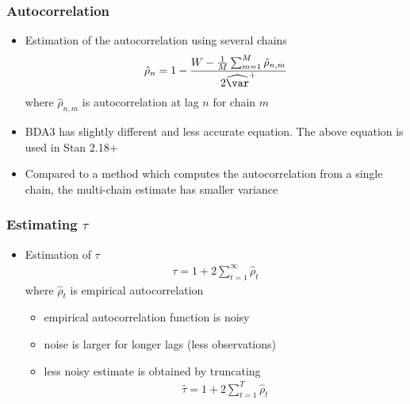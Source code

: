 \documentclass[10pt]{beamer}
\begin{document}
\begin{frame}

\frametitle{Autocorrelation}

  \begin{itemize}
  \item Estimation of the autocorrelation using several chains
    \begin{equation*}
      \hat{\rho}_n=1-\frac{W - \frac{1}{M}\sum_{m=1}^M \hat{\rho}_{n,m}}{2\widehat{\var}^{+}}
    \end{equation*}
    where $\hat{\rho}_{n,m}$ is autocorrelation at lag $n$ for chain $m$
  \item<2-> BDA3 has slightly different and less accurate equation. The
    above equation is used in Stan 2.18+
  \item<3-> Compared to a method which computes the autocorrelation
    from a single chain, the multi-chain estimate has smaller variance
 \end{itemize}
\end{frame}



\begin{frame}

\frametitle{Estimating $\tau$}

  \begin{itemize}
  \item Estimation of $\tau$
    \begin{align*}
      \tau = 1 + 2 \sum_{t=1}^\infty \hat{\rho}_t
    \end{align*}
    where $\hat{\rho}_t$ is empirical autocorrelation
    \begin{itemize}
    \item<2-> empirical autocorrelation function is noisy %
    \item<2-> noise is larger for longer lags (less observations)
    \item<3-> less noisy estimate is obtained by truncating
    \begin{align*}
      \hat{\tau} = 1 + 2 \sum_{t=1}^T \hat{\rho}_t
    \end{align*}
    \end{itemize}
%
    \end{itemize}
\end{frame}
\end{document}
